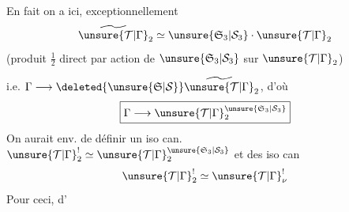 En fait on a ici, exceptionnellement
\[
\widetilde{\unsure{\mathcal T|\Gamma}}_2\simeq\unsure{\mathfrak S_3|\mathcal S_3}\cdot\unsure{\mathcal T|\Gamma}_2
\]
(produit $\frac12$ direct par action de $\unsure{\mathfrak S_3|\mathcal S_3}$ sur $\unsure{\mathcal T|\Gamma}_2$)

i.e. $\Gamma\longrightarrow\deleted{\unsure{\mathfrak S|\mathcal S}}\widetilde{\unsure{\mathcal T|\Gamma}}_2$, d'où
\[
\boxed{\Gamma\longrightarrow\unsure{\mathcal T|\Gamma}_2^{\unsure{\mathfrak S_3|\mathcal S_3}}}
\]
On aurait env. de définir un
iso can. $\unsure{\mathcal T|\Gamma}_2^!\simeq\unsure{\mathcal T|\Gamma}_2^{\unsure{\mathfrak S_3|\mathcal S_3}}$
et des iso can
\[
\unsure{\mathcal T|\Gamma}_2^!\simeq\unsure{\mathcal T|\Gamma}_\nu^!
\]
Pour ceci,    d'
